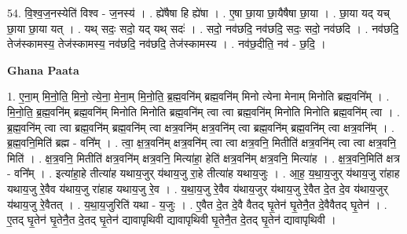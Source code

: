 \documentclass[17pt]{extarticle}
\begin{document}
54. वि॒श्व॒ज॒नस्येति॑ विश्व - ज॒नस्य॑ । . ह्ये॑षैषा हि ह्ये॑षा । . ए॒षा छा॒या छा॒यैषैषा छा॒या । . छा॒या यद् यच् छा॒या छा॒या यत् । . यथ् सदः॒ सदो॒ यद् यथ् सदः॑ । . सदो॒ नव॑छदि॒ नव॑छदि॒ सदः॒ सदो॒ नव॑छदि । . नव॑छदि॒ तेज॑स्कामस्य॒ तेज॑स्कामस्य॒ नव॑छदि॒ नव॑छदि॒ तेज॑स्कामस्य । . नव॑छ॒दीति॒ नव॑ - छ॒दि॒ । \newline

\textbf{Ghana Paata } \newline

1. ए॒ना॒म् मि॒नो॒ति॒ मि॒नो॒ त्ये॒ना॒ मे॒ना॒म् मि॒नो॒ति॒ ब्र॒ह्म॒वनि॑म् ब्रह्म॒वनि॑म् मिनो त्येना मेनाम् मिनोति ब्रह्म॒वनि᳚म् । . मि॒नो॒ति॒ ब्र॒ह्म॒वनि॑म् ब्रह्म॒वनि॑म् मिनोति मिनोति ब्रह्म॒वनि॑म् त्वा त्वा ब्रह्म॒वनि॑म् मिनोति मिनोति ब्रह्म॒वनि॑म् त्वा । . ब्र॒ह्म॒वनि॑म् त्वा त्वा ब्रह्म॒वनि॑म् ब्रह्म॒वनि॑म् त्वा क्षत्र॒वनि॑म् क्षत्र॒वनि॑म् त्वा ब्रह्म॒वनि॑म् ब्रह्म॒वनि॑म् त्वा क्षत्र॒वनि᳚म् । . ब्र॒ह्म॒वनि॒मिति॑ ब्रह्म - वनि᳚म् । . त्वा॒ क्ष॒त्र॒वनि॑म् क्षत्र॒वनि॑म् त्वा त्वा क्षत्र॒वनि॒ मितीति॑ क्षत्र॒वनि॑म् त्वा त्वा क्षत्र॒वनि॒ मिति॑ । . क्ष॒त्र॒वनि॒ मितीति॑ क्षत्र॒वनि॑म् क्षत्र॒वनि॒ मित्या॑हा॒ हेति॑ क्षत्र॒वनि॑म् क्षत्र॒वनि॒ मित्या॑ह । . क्ष॒त्र॒वनि॒मिति॑ क्षत्र - वनि᳚म् । . इत्या॑हा॒हे तीत्या॑ह यथाय॒जुर् य॑थाय॒जु रा॒हे तीत्या॑ह यथाय॒जुः । . आ॒ह॒ य॒था॒य॒जुर् य॑थाय॒जु रा॑हाह यथाय॒जु रे॒वैव य॑थाय॒जु रा॑हाह यथाय॒जु रे॒व । . य॒था॒य॒जु रे॒वैव य॑थाय॒जुर् य॑थाय॒जु रे॒वैत दे॒त दे॒व य॑थाय॒जुर् य॑थाय॒जु रे॒वैतत् । . य॒था॒य॒जुरिति॑ यथा - य॒जुः । . ए॒वैत दे॒त दे॒वै वैतद् घृ॒तेन॑ घृ॒तेनै॒त दे॒वैवैतद् घृ॒तेन॑ । . ए॒तद् घृ॒तेन॑ घृ॒तेनै॒त दे॒तद् घृ॒तेन॑ द्यावापृथिवी द्यावापृथिवी घृ॒तेनै॒त दे॒तद् घृ॒तेन॑ द्यावापृथिवी । \newline
\end{document}
